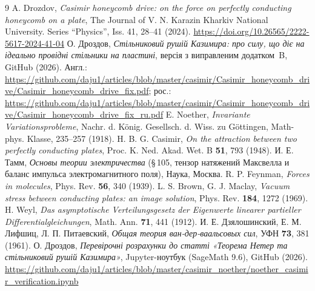 \documentclass[twoside, 10pt]{article}
\begin{document}
\begin{thebibliography}{9}
A. Drozdov, \textit{Casimir honeycomb drive: on the force on perfectly conducting honeycomb on a plate}, The Journal of V. N. Karazin Kharkiv National University. Series “Physics”, Iss. 41, 28--41 (2024). \url{https://doi.org/10.26565/2222-5617-2024-41-04}
О. Дроздов, \textit{Стільниковий рушій Казимира: про силу, що діє на ідеально провідні стільники на пластині}, версія з виправленим додатком~B, GitHub (2026). Англ.: \url{https://github.com/daju1/articles/blob/master/casimir/Casimir_honeycomb_drive/Casimir_honeycomb_drive_fix.pdf}; рос.: \url{https://github.com/daju1/articles/blob/master/casimir/Casimir_honeycomb_drive/Casimir_honeycomb_drive_fix_ru.pdf}
E. Noether, \textit{Invariante Variationsprobleme}, Nachr. d. König. Gesellsch. d. Wiss. zu Göttingen, Math-phys. Klasse, 235–257 (1918).
H. B. G. Casimir, \textit{On the attraction between two perfectly conducting plates}, Proc. K. Ned. Akad. Wet. B \textbf{51}, 793 (1948).
И. Е. Тамм, \textit{Основы теории электричества} (\S\,105, тензор натяжений Максвелла и баланс импульса электромагнитного поля), Наука, Москва.
R. P. Feynman, \textit{Forces in molecules}, Phys. Rev. \textbf{56}, 340 (1939).
L. S. Brown, G. J. Maclay, \textit{Vacuum stress between conducting plates: an image solution}, Phys. Rev. \textbf{184}, 1272 (1969).
H. Weyl, \textit{Das asymptotische Verteilungsgesetz der Eigenwerte linearer partieller Differentialgleichungen}, Math. Ann. \textbf{71}, 441 (1912).
И. Е. Дзялошинский, Е. М. Лифшиц, Л. П. Питаевский, \textit{Общая теория ван-дер-ваальсовых сил}, УФН \textbf{73}, 381 (1961).
О. Дроздов, \textit{Перевірочні розрахунки до статті «Теорема Нетер та стільниковий рушій Казимира»}, Jupyter-ноутбук (SageMath 9.6), GitHub (2026). \url{https://github.com/daju1/articles/blob/master/casimir_noether/noether_casimir_verification.ipynb}
\end{thebibliography}
\end{document}
